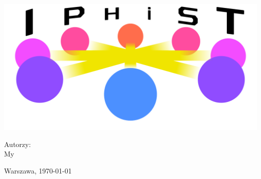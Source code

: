 \begin{titlepage}
\pagestyle{empty}

\vfill
\begin{center}
\includegraphics[width=\textwidth]{img/logo.pdf}
\end{center}

\begin{center}
\large
Autorzy: \\
\Large
My
\end{center}


\vfill
\begin{center}
Warszawa, \today
\end{center}

\end{titlepage} 
